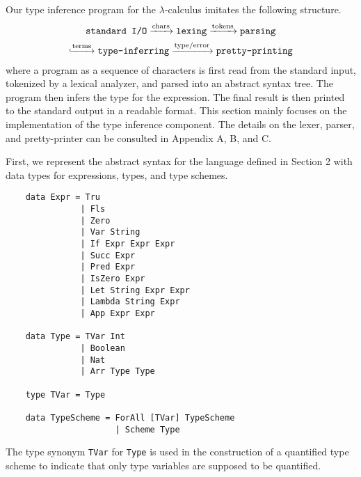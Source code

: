 Our type inference program for the $\lambda$-calculus imitates 
the following structure.
\begin{gather*}
    \texttt{standard I/O} \xrightarrow{\text{chars}}
    \texttt{lexing} \xrightarrow{\text{tokens}} \texttt{parsing} \\
    \lhook\joinrel\xrightarrow{\text{terms}} \texttt{type-inferring} 
    \xrightarrow{\text{type}/\text{error}} \texttt{pretty-printing}
\end{gather*}
where a program as a sequence of characters is first read from the 
standard input, tokenized by a lexical analyzer, and parsed into 
an abstract syntax tree. The program then infers the type for  
the expression. The final 
result is then printed to the standard output in a readable format. 
This section mainly focuses on the implementation of the type 
inference component. 
The details on the lexer, parser, and pretty-printer can be consulted 
in Appendix A, B, and C.

First, we represent the abstract syntax for the language defined in Section 2 
with data types for expressions, types, and type schemes.  
\begin{lstlisting}
    data Expr = Tru                   
               | Fls                   
               | Zero                  
               | Var String            
               | If Expr Expr Expr     
               | Succ Expr             
               | Pred Expr             
               | IsZero Expr           
               | Let String Expr Expr  
               | Lambda String Expr    
               | App Expr Expr 
               
    data Type = TVar Int       
               | Boolean        
               | Nat            
               | Arr Type Type 
    
    type TVar = Type

    data TypeScheme = ForAll [TVar] TypeScheme
                      | Scheme Type
\end{lstlisting}
The type synonym \lstinline{TVar} for \lstinline{Type} is used in  
the construction of a quantified type scheme to indicate that only 
type variables are supposed to be quantified. 

